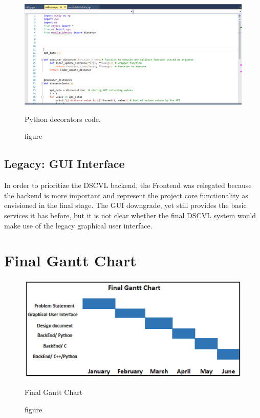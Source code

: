 \documentclass[onecolumn, draftclsnofoot,10pt, compsoc]{IEEEtran}
\begin{document}
 \begin{figure}[H]
 \centering
			\includegraphics[scale=0.5]{images/python-ext.eps}
			\caption{figure}{Python decorators code.}
			\label{python-code}
		\end{figure}
		
		
\subsection{ Legacy: GUI Interface}

In order to prioritize the DSCVL backend, the Frontend was relegated because the backend is more important and represent the project core functionality as envisioned in the final stage. The GUI downgrade, yet still provides the basic services it has before, but it is not clear whether the final DSCVL system would make use of the legacy graphical user interface.
		
		 

\section{Final Gantt Chart}

 \begin{figure}[H]
 \centering
			\includegraphics[scale=1]{images/gantt.eps}
			\caption{figure}{Final Gantt Chart}
			\label{gantt}
		\end{figure}
			
\end{document}
